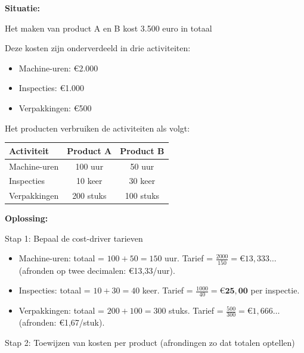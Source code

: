 \documentclass[a4paper,11pt]{article}
\begin{document}
\begin{oefenblok}[title=Oefening uit examen: Activity Based Costing (ABC)]
    \textbf{Situatie:}

    Het maken van product A en B kost 3.500 euro in totaal
    
    Deze kosten zijn onderverdeeld in drie activiteiten:
    \begin{itemize}
        \item Machine-uren: €2.000
        \item Inspecties: €1.000
        \item Verpakkingen: €500
    \end{itemize}

    Het producten verbruiken de activiteiten als volgt:

    \begin{tabular}{lcc}
    \hline
    \textbf{Activiteit} & \textbf{Product A} & \textbf{Product B} \\
    \hline
    Machine-uren & 100 uur & 50 uur \\
    Inspecties & 10 keer & 30 keer \\
    Verpakkingen & 200 stuks & 100 stuks \\
    \hline
    \end{tabular}

    \vspace{4mm}
    \textbf{Oplossing:}

    Stap 1: Bepaal de cost-driver tarieven
    \begin{itemize}
        \item Machine-uren: totaal = $100 + 50 = 150$ uur. Tarief = $\frac{2000}{150} = €13{,}333\ldots$ (afronden op twee decimalen: €13,33/uur).
        \item Inspecties: totaal = $10 + 30 = 40$ keer. Tarief = $\frac{1000}{40} = \mathbf{€25{,}00}$ per inspectie.
        \item Verpakkingen: totaal = $200 + 100 = 300$ stuks. Tarief = $\frac{500}{300} = €1{,}666\ldots$ (afronden: €1,67/stuk).
    \end{itemize}

    Stap 2: Toewijzen van kosten per product (afrondingen zo dat totalen optellen)


\end{oefenblok}
\end{document}
